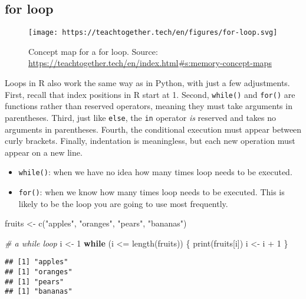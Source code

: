 \documentclass[
]{book}
\newenvironment{Shaded}{\begin{snugshade}}{\end{snugshade}}
\newcommand{\CommentTok}[1]{\textcolor[rgb]{0.56,0.35,0.01}{\textit{#1}}}
\newcommand{\ControlFlowTok}[1]{\textcolor[rgb]{0.13,0.29,0.53}{\textbf{#1}}}
\newcommand{\DecValTok}[1]{\textcolor[rgb]{0.00,0.00,0.81}{#1}}
\newcommand{\FunctionTok}[1]{\textcolor[rgb]{0.00,0.00,0.00}{#1}}
\newcommand{\NormalTok}[1]{#1}
\newcommand{\OtherTok}[1]{\textcolor[rgb]{0.56,0.35,0.01}{#1}}
\newcommand{\SpecialCharTok}[1]{\textcolor[rgb]{0.00,0.00,0.00}{#1}}
\newcommand{\StringTok}[1]{\textcolor[rgb]{0.31,0.60,0.02}{#1}}
\providecommand{\tightlist}{%
  \setlength{\itemsep}{0pt}\setlength{\parskip}{0pt}}
\begin{document}
\hypertarget{for-loop}{%
\subsection{for loop}\label{for-loop}}

\begin{figure}
\centering
\texttt{[image: https://teachtogether.tech/en/figures/for-loop.svg]}
\caption{Concept map for a for loop. Source: \url{https://teachtogether.tech/en/index.html\#s:memory-concept-maps}}
\end{figure}

Loops in R also work the same way as in Python, with just a few adjustments. First, recall that index positions in R start at 1. Second, \texttt{while()} and \texttt{for()} are functions rather than reserved operators, meaning they must take arguments in parentheses. Third, just like \texttt{else}, the \texttt{in} operator \emph{is} reserved and takes no arguments in parentheses. Fourth, the conditional execution must appear between curly brackets. Finally, indentation is meaningless, but each new operation must appear on a new line.

\begin{itemize}
\tightlist
\item
  \texttt{while()}: when we have no idea how many times loop needs to be executed.
\item
  \texttt{for()}: when we know how many times loop needs to be executed. This is likely to be the loop you are going to use most frequently.
\end{itemize}

\begin{Shaded}
\begin{Highlighting}[]
\NormalTok{fruits }\OtherTok{\textless{}{-}} \FunctionTok{c}\NormalTok{(}\StringTok{"apples"}\NormalTok{, }\StringTok{"oranges"}\NormalTok{, }\StringTok{"pears"}\NormalTok{, }\StringTok{"bananas"}\NormalTok{)}

\CommentTok{\# a while loop}
\NormalTok{i }\OtherTok{\textless{}{-}} \DecValTok{1}
\ControlFlowTok{while}\NormalTok{ (i }\SpecialCharTok{\textless{}=} \FunctionTok{length}\NormalTok{(fruits)) \{}
  \FunctionTok{print}\NormalTok{(fruits[i])}
\NormalTok{  i }\OtherTok{\textless{}{-}}\NormalTok{ i }\SpecialCharTok{+} \DecValTok{1}
\NormalTok{\}}
\end{Highlighting}
\end{Shaded}

\begin{verbatim}
## [1] "apples"
## [1] "oranges"
## [1] "pears"
## [1] "bananas"
\end{verbatim}
\end{document}
